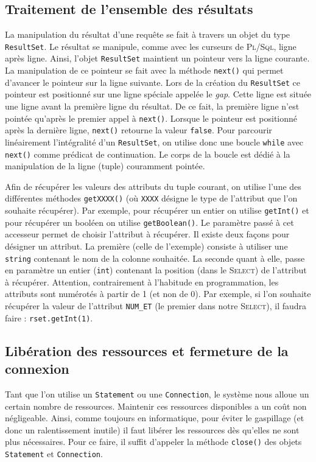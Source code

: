 \documentclass[a4paper,11pt]{article}
\begin{document}
\subsection{Traitement de l'ensemble des résultats}
La manipulation du résultat d'une requête se fait à travers un objet du type \texttt{ResultSet}.
Le résultat se manipule, comme avec les curseurs de \textsc{Pl/Sql}, ligne après ligne. Ainsi, l'objet 
\texttt{ResultSet} maintient un pointeur vers la ligne courante. La manipulation de ce pointeur se fait avec la 
méthode \texttt{next()} qui permet d'avancer le pointeur sur la ligne suivante. Lors de la création 
du \texttt{ResultSet} ce pointeur est positionné sur une ligne spéciale appelée le \emph{gap}. Cette ligne 
est située une ligne avant la première ligne du résultat. De ce fait, la première ligne n'est pointée  qu'après le 
premier appel à \texttt{next()}. Lorsque le pointeur est positionné après la dernière ligne, \texttt{next()} retourne 
la valeur \texttt{false}. Pour parcourir linéairement l'intégralité d'un \texttt{ResultSet}, on 
utilise donc une boucle \texttt{while} avec \texttt{next()} comme prédicat de continuation. Le corps de 
la boucle est dédié à la manipulation de la ligne (tuple) couramment pointée.

Afin de récupérer les valeurs des attributs du tuple courant, on utilise l'une des différentes 
méthodes \texttt{getXXXX()} (où \texttt{XXXX} désigne le type de l'attribut que l'on 
souhaite récupérer). Par exemple, pour récupérer un entier on utilise \texttt{getInt()} et 
pour récupérer un booléen on utilise \texttt{getBoolean()}. Le paramètre passé à cet accesseur 
permet de choisir l'attribut à récupérer. Il existe deux façons pour désigner un attribut. 
La première (celle de l'exemple) consiste à utiliser une \texttt{string} contenant le nom 
de la colonne souhaitée. La seconde quant à elle, passe en paramètre un entier (\texttt{int}) contenant la position (dans le \textsc{Select}) 
de l'attribut à récupérer. Attention, contrairement à l'habitude en programmation, les attributs 
sont numérotés à partir de 1 (et non de 0). Par exemple, si l'on souhaite récupérer la valeur 
de l'attribut \texttt{NUM\_ET} (le premier dans notre \textsc{Select}), il faudra faire : \texttt{rset.getInt(1)}.

\subsection{Libération des ressources et fermeture de la connexion}
Tant que l'on utilise un \texttt{Statement} ou une \texttt{Connection}, le système nous alloue un certain 
nombre de ressources. Maintenir ces ressources disponibles a un coût non négligeable. Ainsi, comme toujours en 
informatique, pour éviter le gaspillage (et donc un ralentissement inutile) il faut libérer les ressources dès 
qu'elles ne sont plus nécessaires. Pour ce faire, il suffit d'appeler la méthode \texttt{close()} des objets 
\texttt{Statement} et \texttt{Connection}.
\end{document}
